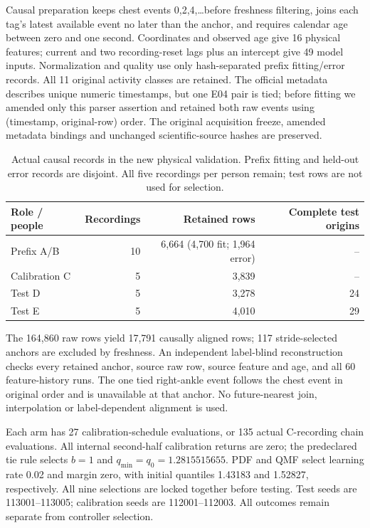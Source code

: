 \documentclass[10pt]{article}
\begin{document}
Causal preparation keeps chest events 0,2,4,\ldots before freshness
filtering, joins each tag's latest available event no later than the
anchor, and requires calendar age between zero and one second.
Coordinates and observed age give 16 physical features; current and two
recording-reset lags plus an intercept give 49 model inputs. Normalization
and quality use only hash-separated prefix fitting/error records. All
11 original activity classes are retained. The official metadata describes
unique numeric timestamps, but one E04 pair is tied; before fitting we
amended only this parser assertion and retained both raw events using
(timestamp, original-row) order. The original acquisition freeze, amended
metadata bindings and unchanged scientific-source hashes are preserved.

\begin{table}[t]
\centering\small
\caption{Actual causal records in the new physical validation. Prefix
fitting and held-out error records are disjoint. All five recordings per
person remain; test rows are not used for selection.}
\label{tab:new-physical-data}
\begin{tabular}{lrrr}
\toprule
Role / people & Recordings & Retained rows & Complete test origins\\
\midrule
Prefix A/B & 10 & 6,664 (4,700 fit; 1,964 error) & --\\
Calibration C & 5 & 3,839 & --\\
Test D & 5 & 3,278 & 24\\
Test E & 5 & 4,010 & 29\\
\bottomrule
\end{tabular}
\end{table}

The 164,860 raw rows yield 17,791 causally aligned rows; 117 stride-selected
anchors are excluded by freshness. An independent label-blind reconstruction
checks every retained anchor, source raw row, source feature and age, and
all 60 feature-history runs. The one tied right-ankle event follows the
chest event in original order and is unavailable at that anchor.
No future-nearest join, interpolation or label-dependent alignment is used.

Each arm has 27 calibration-schedule evaluations, or 135 actual C-recording
chain evaluations. All internal second-half calibration returns are zero;
the predeclared tie rule selects $b=1$ and $q_{\min}=q_0=1.2815515655$.
PDF and QMF select learning rate 0.02 and margin zero, with initial
quantiles 1.43183 and 1.52827, respectively. All nine selections are locked
together before testing. Test seeds are 113001--113005; calibration seeds
are 112001--112003. All outcomes remain separate from controller selection.
\end{document}
